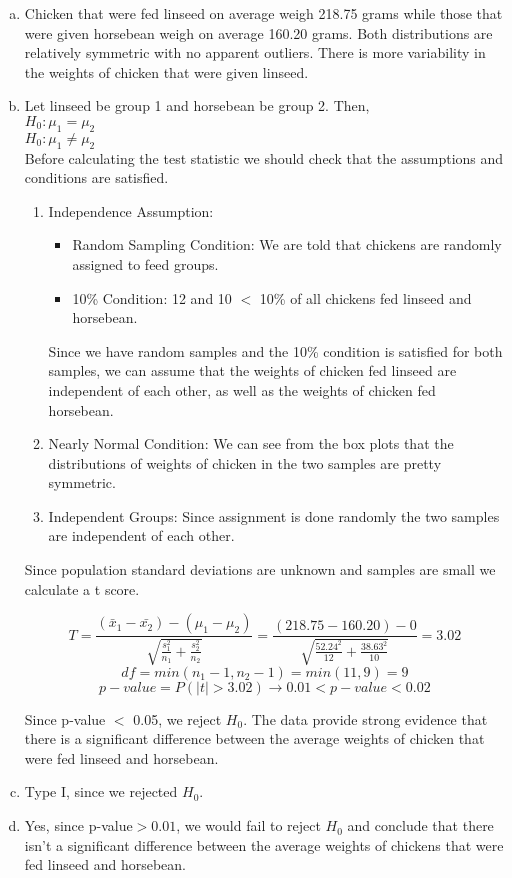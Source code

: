 {
\begin{enumerate}[(a)]
\setlength{\itemsep}{0mm}

\item Chicken that were fed linseed on average weigh 218.75 grams while those that were given horsebean weigh on average 160.20 grams. Both distributions are relatively symmetric with no apparent outliers. There is more variability in the weights of chicken that were given linseed.

\item Let linseed be group 1 and horsebean be group 2. Then,\\
$H_0: \mu_1 = \mu_2$ \\
$H_0: \mu_1 \ne \mu_2$ \\

Before calculating the test statistic we should check that the assumptions and conditions are satisfied.
\begin{enumerate}[1.]
\item Independence Assumption: 
\begin{itemize}
\item Random Sampling Condition: We are told that chickens are randomly assigned to feed groups.
\item 10\% Condition: 12 and 10 $<$ 10\% of all chickens fed linseed and horsebean.
\end{itemize}
Since we have random samples and the 10\% condition is satisfied for both samples, we can assume that the weights of chicken fed linseed are independent of each other, as well as the weights of chicken fed horsebean.
\item Nearly Normal Condition: We can see from the box plots that the distributions of weights of chicken in the two samples are pretty symmetric.
\item Independent Groups: Since assignment is done randomly the two samples are independent of each other.
\end{enumerate}

Since population standard deviations are unknown and samples are small we calculate a t score.

\[ T = \frac{(\bar{x}_1 - \bar{x_2}) - (\mu_1 - \mu_2)}{\sqrt{ \frac{s_1^2}{n_1} + \frac{s_2^2}{n_2} }} = \frac{(218.75 - 160.20) - 0}{ \sqrt{\frac{52.24^2}{12} + \frac{38.63^2}{10}} } = 3.02 \]
\[ df = min(n_1 - 1, n_2 - 1) = min(11,9) = 9 \]
\[ p-value = P(|t| > 3.02) \rightarrow 0.01 < p-value < 0.02 \]

Since p-value $<$ 0.05, we reject $H_0$. The data provide strong evidence that there is a significant difference between the average weights of chicken that were fed linseed and horsebean.

\item Type I, since we rejected $H_0$.

\item Yes, since p-value$> 0.01$, we would fail to reject $H_0$ and conclude that there isn't a significant difference between the average weights of chickens that were fed linseed and horsebean.

\end{enumerate}
}\label{chickwts}

